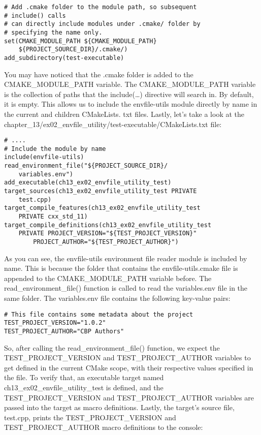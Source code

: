 \begin{lstlisting}[style=styleCMake]
# Add .cmake folder to the module path, so subsequent 
# include() calls
# can directly include modules under .cmake/ folder by
# specifying the name only.
set(CMAKE_MODULE_PATH ${CMAKE_MODULE_PATH}
	${PROJECT_SOURCE_DIR}/.cmake/)
add_subdirectory(test-executable)
\end{lstlisting}

You may have noticed that the .cmake folder is added to the CMAKE\_MODULE\_PATH variable. The CMAKE\_MODULE\_PATH variable is the collection of paths that the include(…) directive will search in. By default, it is empty. This allows us to include the envfile-utils module directly by name in the current and children CMakeLists. txt files. Lastly, let's take a look at the chapter\_13/ex02\_envfile\_utility/test-executable/CMakeLists.txt file:

\begin{lstlisting}[style=styleCMake]
# ....
# Include the module by name
include(envfile-utils)
read_environment_file("${PROJECT_SOURCE_DIR}/
	variables.env")
add_executable(ch13_ex02_envfile_utility_test)
target_sources(ch13_ex02_envfile_utility_test PRIVATE
	test.cpp)
target_compile_features(ch13_ex02_envfile_utility_test
	PRIVATE cxx_std_11)
target_compile_definitions(ch13_ex02_envfile_utility_test
	PRIVATE PROJECT_VERSION="${TEST_PROJECT_VERSION}"
		PROJECT_AUTHOR="${TEST_PROJECT_AUTHOR}")
\end{lstlisting}

As you can see, the envfile-utils environment file reader module is included by name. This is because the folder that contains the envfile-utils.cmake file is appended to the CMAKE\_MODULE\_PATH variable before. The read\_environment\_file() function is called to read the variables.env file in the same folder. The variables.env file contains the following key-value pairs:

\begin{lstlisting}[style=styleCMake]
# This file contains some metadata about the project
TEST_PROJECT_VERSION="1.0.2"
TEST_PROJECT_AUTHOR="CBP Authors"
\end{lstlisting}

So, after calling the read\_environment\_file() function, we expect the TEST\_PROJECT\_VERSION and TEST\_PROJECT\_AUTHOR variables to get defined in the current CMake scope, with their respective values specified in the file. To verify that, an executable target named ch13\_ex02\_envfile\_utility\_test is defined, and the TEST\_PROJECT\_VERSION and TEST\_PROJECT\_AUTHOR variables are passed into the target as macro definitions. Lastly, the target's source file, test.cpp, prints the TEST\_PROJECT\_VERSION and TEST\_PROJECT\_AUTHOR macro definitions to the console:

